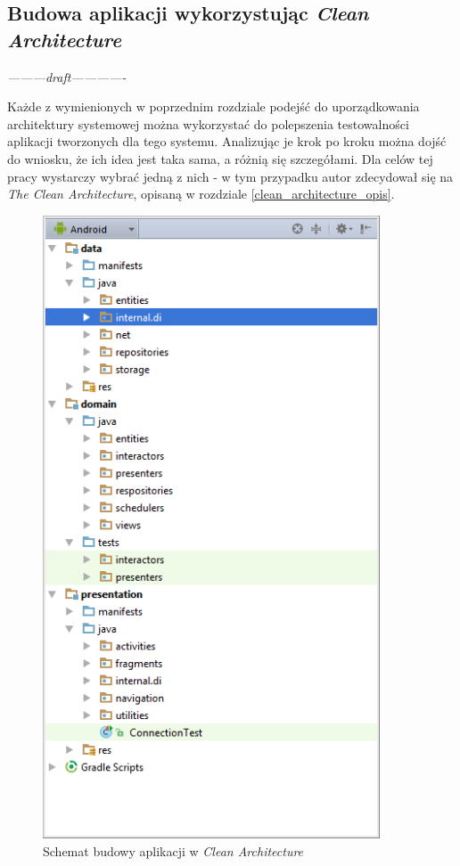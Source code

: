 \subsection{Budowa aplikacji wykorzystując \textit{Clean Architecture}}
\textit{---------draft-------------}

Każde z wymienionych w poprzednim rozdziale podejść do uporządkowania architektury systemowej można wykorzystać do polepszenia testowalności aplikacji tworzonych dla tego systemu. Analizując je krok po kroku można dojść do wniosku, że ich idea jest taka sama, a różnią się szczegółami. Dla celów tej pracy wystarczy wybrać jedną z nich - w tym przypadku autor zdecydował się na \textit{The Clean Architecture}, opisaną w rozdziale \ref{clean_architecture_opis}.

\begin{figure}[!htb]
    \centering
    \includegraphics[width=10cm]{imgs/ch6_app_cl.png}
    \caption
{Schemat budowy aplikacji w \textit{Clean Architecture}}
    \label{fig:app_std}
\end{figure} 


